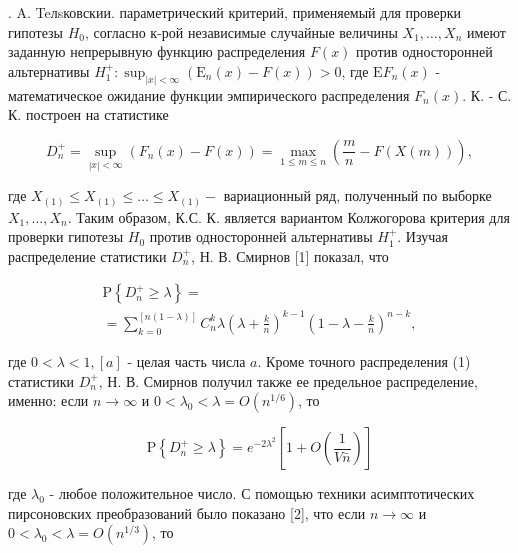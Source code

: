 \documentclass[10pt]{article}
\begin{document}
. A. Teлsковскии. параметрический критерий, применяемый для проверки гипотезы $H_{0}$, согласно к-рой независимые случайные величины $X_{1}, \ldots, X_{n}$ имеют заданную непрерывную функцию распределения $F(x)$ против односторонней альтернативы $H_{1}^{+}: \sup _{|x|<\infty}\left(\mathrm{E}_{n}(x)-F(x)\right)>0$, где $\mathrm{E} F_{n}(x)$ - математическое ожидание функции эмпирического распределения $F_{n}(x)$. К. - С. К. построен на статистике



\[

D_{n}^{+}=\sup _{|x|<\infty}\left(F_{n}(x)-F(x)\right)=\max _{1 \leqslant m \leqslant n}\left(\frac{m}{n}-F(X(m))\right),

\]



где $X_{(1)} \leqslant X_{(1)} \leqslant \ldots \leqslant X_{(1)}-$ вариационный ряд, полученный по выборке $X_{1}, \ldots, X_{n}$. Таким образом, К.С. К. является вариантом Колжогорова критерия для проверки гипотезы $H_{0}$ против односторонней альтернативы $H_{1}^{+}$. Изучая распределение статистики $D_{n}^{+}$, Н. В. Смирнов [1] показал, что



\[

\begin{gathered}

\mathrm{P}\left\{D_{n}^{+} \geqslant \lambda\right\}= \\

=\sum_{k=0}^{[n(1-\lambda)]} C_{n}^{k} \lambda\left(\lambda+\frac{k}{n}\right)^{k-1}\left(1-\lambda-\frac{k}{n}\right)^{n-k},

\end{gathered}

\]



где $0<\lambda<1,[a]$ - целая часть числа $a$. Кроме точного распределения (1) статистики $D_{n}^{+}$, Н. В. Смирнов получил также ее предельное распределение, именно: если $n \rightarrow \infty$ и $0<\lambda_{0}<\lambda=O\left(n^{1 / 6}\right)$, то



\[

\mathrm{P}\left\{D_{n}^{+} \geqslant \lambda\right\}=e^{-2 \lambda^{2}}\left[1+O\left(\frac{1}{V \bar{n}}\right)\right]

\]



где $\lambda_{0}$ - любое положительное число. С помощью техники асимптотических пирсоновских преобразований было показано [2], что если $n \rightarrow \infty$ и $0<\lambda_{0}<\lambda=O\left(n^{1 / 3}\right)$, то
\end{document}

